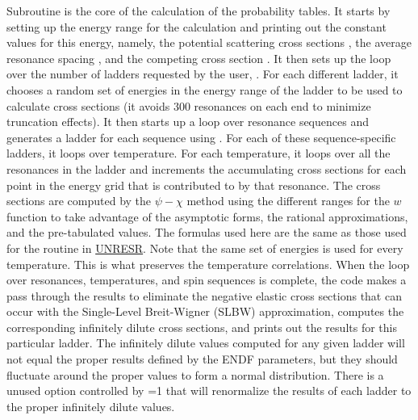 Subroutine 
is the core of the calculation of the
probability tables.  It starts by setting up the energy range for
the calculation and printing out the constant values for this energy,
namely, the potential scattering cross sections , the
average resonance spacing , and the competing cross
section .  It then sets up the loop over the number of
ladders requested by the user, .  For each different
ladder, it chooses a random set of energies in the energy range of
the ladder to be used to calculate cross sections (it avoids 300
resonances on each end to minimize truncation effects).  It then
starts up a loop over resonance sequences and generates a ladder for
each sequence using .  For each of these sequence-specific
ladders, it loops over temperature.  For each temperature, it loops over
all the resonances in the ladder and increments the accumulating cross
sections for each point in the energy grid that is contributed to
by that resonance.  The cross sections are computed by the $\psi{-}\chi$
method using the different ranges for the $w$ function to take
advantage of the asymptotic forms, the rational approximations, and
the pre-tabulated values.  The formulas used here are the same as those
used for the  routine in
\hyperlink{sUNRESRhy}{UNRESR}.  Note that the same set of
energies is used for every temperature.  This is what preserves the
temperature correlations.  When the loop over resonances, temperatures,
and spin sequences is complete,  the code makes a pass through the
results to eliminate the negative elastic cross sections that can
occur with the Single-Level Breit-Wigner (SLBW) approximation,
computes the corresponding infinitely dilute cross sections, and
prints out the results for this particular ladder.  The infinitely
dilute values computed for any given ladder will not equal the
proper results defined by the ENDF parameters, but they should
fluctuate around the proper values to form a normal distribution.
There is a unused option controlled by =1 that will
renormalize the results of each ladder to the proper infinitely
dilute values.


